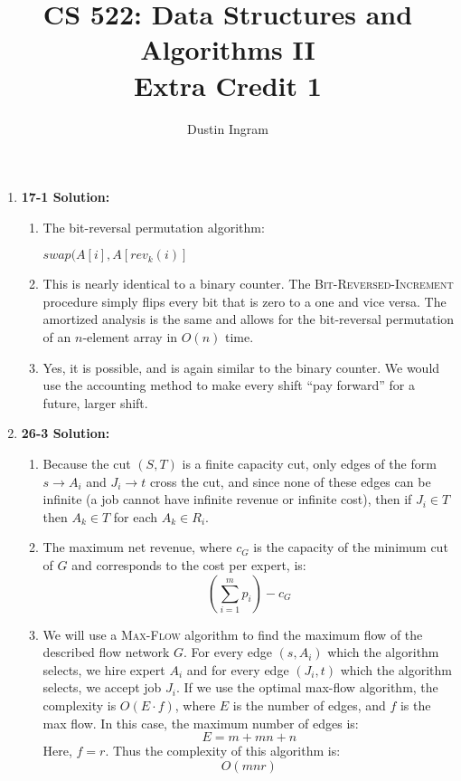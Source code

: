 \documentclass{article}
\title{CS 522: Data Structures and Algorithms II \\ Extra Credit 1}
\author{Dustin Ingram}
\begin{document}
\maketitle
\begin{enumerate}
    \item \textbf{17-1 Solution:}
    \begin{enumerate}
        \item The bit-reversal permutation algorithm:
        \begin{algorithm}[H]
        \begin{algorithmic}
        \caption{}
        \STATE $swap(A[i], A[rev_{k}(i)]$
        \ENDIF
        \ENDFOR
        \end{algorithmic}
        \end{algorithm}
        \item This is nearly identical to a binary counter. The
        \textsc{Bit-Reversed-Increment} procedure simply flips every bit that is
        zero to a one and vice versa. The amortized analysis is the same and
        allows for the bit-reversal permutation of an $n$-element array in
        $O(n)$ time.
        \item Yes, it is possible, and is again similar to the binary counter.
        We would use the accounting method to make every shift ``pay forward''
        for a future, larger shift.
    \end{enumerate}
    \item \textbf{26-3 Solution:}
        \begin{enumerate}
            \item Because the cut $(S,T)$ is a finite capacity cut, only edges
            of the form $s\rightarrow A_{i}$ and $J_{i}\rightarrow t$ cross the
            cut, and since none of these edges can be infinite (a job cannot
            have infinite revenue or infinite cost), then if $J_{i}\in T$ then
            $A_{k}\in T$ for each $A_{k}\in R_{i}$.  \item The maximum net
            revenue, where $c_{G}$ is the capacity of the minimum cut of $G$ and
            corresponds to the cost per expert, is: $$
            \left(\sum_{i=1}^{m}{p_i}\right) - c_{G}$$ \item We will use a
            \textsc{Max-Flow} algorithm to find the maximum flow of the
            described flow network $G$. For every edge $(s, A_{i})$ which the
            algorithm selects, we hire expert $A_i$ and for every edge $(J_{i},
            t)$ which the algorithm selects, we accept job $J_i$. If we use the
            optimal max-flow algorithm, the complexity is $O(E\cdot f)$, where
            $E$ is the number of edges, and $f$ is the max flow. In this case,
            the maximum number of edges is:
            $$ E = m + mn + n $$
            Here, $f=r$. Thus the complexity of this algorithm is:
            $$ O(mnr) $$
        \end{enumerate}
    \end{enumerate}
\end{document}
